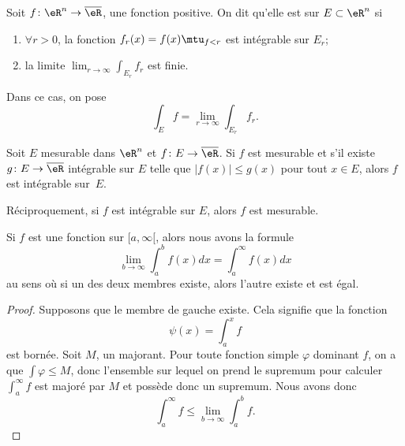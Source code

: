 Soit $f\colon \eR^n\to \overline{ \eR }$, une fonction positive. On dit qu'elle est  sur $E\subset\eR^n$ si
\begin{enumerate}
    \item $\forall r>0$, la fonction $f_r(x)=f(x)\mtu_{f<r}$ est intégrable sur $E_r$;
\item la limite $\lim_{r\to\infty}\int_{E_r}f_r$ est finie.
\end{enumerate}
Dans ce cas, on pose 
\begin{equation}
	\int_Ef=\lim_{r\to\infty}\int_{E_r}f_r.
\end{equation}

\begin{theorem}	\label{ThoFnTestIntnnBorn}
Soit $E$ mesurable dans $\eR^n$ et $f\colon E\to \overline{ \eR }$. Si $f$ est mesurable et s'il existe $g\colon E\to \overline{ \eR }$ intégrable sur $E$ telle que $| f(x) |\leq g(x)$ pour tout $x\in E$, alors $f$ est intégrable sur~$E$.

Réciproquement, si $f$ est intégrable sur $E$, alors $f$ est mesurable.
\end{theorem}

\begin{lemma}\label{LemTHBSEs}
    Si \( f\) est une fonction sur \( \mathopen[ a , \infty [\), alors nous avons la formule
    \begin{equation}
        \lim_{b\to \infty}\int_a^bf(x)dx=\int_a^{\infty}f(x)dx
    \end{equation}
    au sens où si un des deux membres existe, alors l'autre existe et est égal.
\end{lemma}

\begin{proof}
    Supposons que le membre de gauche existe. Cela signifie que la fonction
    \begin{equation}
        \psi(x)=\int_a^xf
    \end{equation}
    est bornée. Soit \( M\), un majorant. Pour toute fonction simple \( \varphi\) dominant \( f\), on a que \( \int\varphi\leq M\), donc l'ensemble sur lequel on prend le supremum pour calculer \( \int_a^{\infty}f\) est majoré par \( M\) et possède donc un supremum. Nous avons donc
    \begin{equation}
        \int_a^{\infty}f\leq\lim_{b\to\infty}\int_a^bf.
    \end{equation}
\end{proof}
